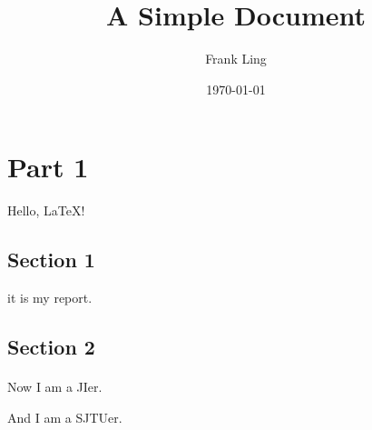\documentclass[10pt]{article}
\title{A Simple Document}
\author{Frank Ling}
\date{\today}
\begin{document}
    \maketitle
    \tableofcontents
    \newpage
    \section{Part 1}
    Hello, \LaTeX !
        \subsection{Section 1}
        it is my report.
        \subsection{Section 2}
        \paragraph{}
        Now I am a JIer.
        \par
        And I am a SJTUer.
\end{document}
